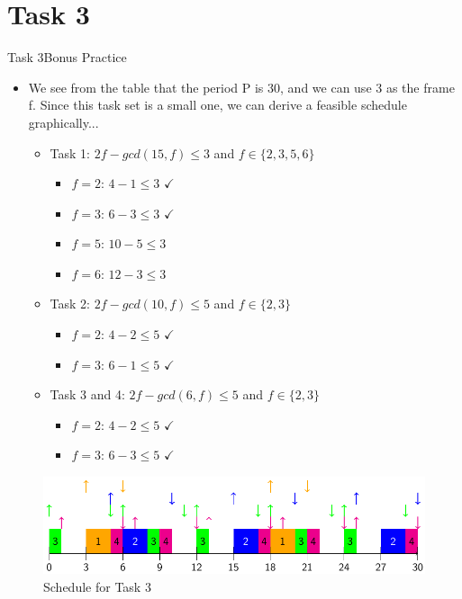 
\section{Task 3}

\setcounter{task}{1}

\begin{frame}[allowframebreaks]{Task 3}{Bonus Practice\vspace{0.5cm}}
  \begin{itemize}
    \item We see from the table that the period P is 30, and we can use 3 as the frame f. Since this task set is a small one, we can derive a feasible schedule graphically...
    \begin{itemize}
      \item \alert{Task 1:} $2f-gcd(15, f)\le 3$  and $f\in\{2, 3, 5, 6\}$
      \begin{itemize}
        \item $f=2$: $4-1\le 3$ $\checkmark$
        \item $f=3$: $6-3\le 3$ $\checkmark$
        \item $f=5$: $10-5\le 3$
        \item $f=6$: $12-3\le 3$
      \end{itemize}
      \item \alert{Task 2:} $2f-gcd(10, f)\le 5$  and $f\in\{2, 3\}$
      \begin{itemize}
        \item $f=2$: $4-2\le 5$ $\checkmark$
        \item $f=3$: $6-1\le 5$ $\checkmark$
      \end{itemize}
      \item \alert{Task 3 and 4:} $2f-gcd(6, f)\le 5$  and $f\in\{2, 3\}$
      \begin{itemize}
        \item $f=2$: $4-2\le 5$ $\checkmark$
        \item $f=3$: $6-3\le 5$ $\checkmark$
      \end{itemize}
    \end{itemize}
  \end{itemize}
  \begin{figure}
    \includegraphics[width=0.7\paperwidth]{./figures/task3_schedule.png}
    \caption{Schedule for Task 3}
  \end{figure}
\end{frame}
